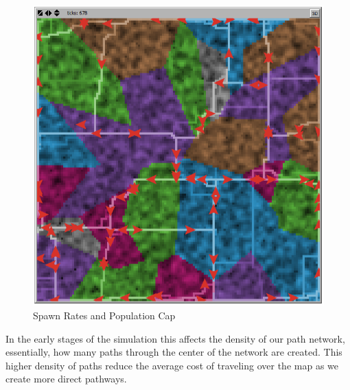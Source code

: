 \documentclass[conference]{IEEEtran}
\begin{document}
\begin{figure}[h]
\begin{center}
\includegraphics[scale=0.4]{image/results4}
\end{center}
\caption{Spawn Rates and Population Cap}
\end{figure}
	
	In the early stages of the simulation this affects the density of our path network, essentially, how many paths through the center of the network are created. This higher density of paths reduce the average cost of traveling over the map as we create more direct pathways.
	
\end{document}
